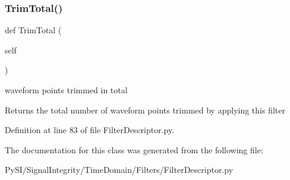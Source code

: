 \subsubsection{\texorpdfstring{Trim\+Total()}{TrimTotal()}}
{\footnotesize\ttfamily def Trim\+Total (\begin{DoxyParamCaption}\item[{}]{self }\end{DoxyParamCaption})}



waveform points trimmed in total 

\begin{DoxyReturn}{Returns}
the total number of waveform points trimmed by applying this filter 
\end{DoxyReturn}


Definition at line 83 of file Filter\+Descriptor.\+py.



The documentation for this class was generated from the following file\+:\begin{DoxyCompactItemize}
\item 
Py\+S\+I/\+Signal\+Integrity/\+Time\+Domain/\+Filters/Filter\+Descriptor.\+py\end{DoxyCompactItemize}
